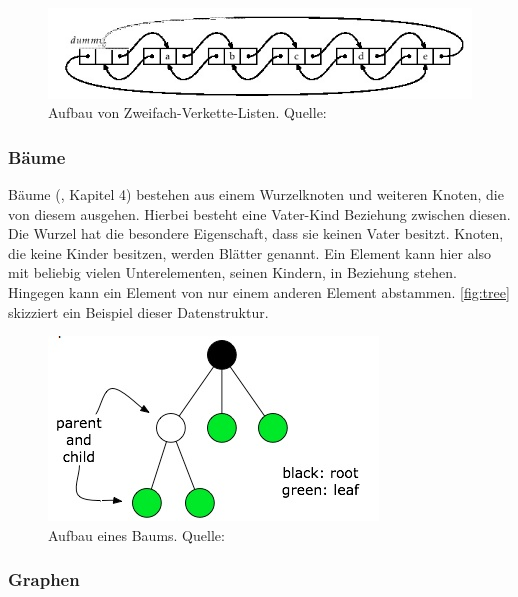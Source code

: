 \documentclass[a4paper]{article}
\begin{document}
	\begin{figure}[H] 
		\includegraphics[width=\linewidth]{../Bilder/double_linked_list.jpg}
		\caption
		{
			Aufbau von Zweifach-Verkette-Listen.
			Quelle: \cite{DLList}
		}
		\label{fig:double_linked_list}
	\end{figure}	
	
	\subsubsection{Bäume}
		
	Bäume (\cite{FundData}, Kapitel 4) bestehen aus einem Wurzelknoten
	und weiteren Knoten, die von diesem ausgehen. Hierbei besteht eine Vater-Kind
	Beziehung zwischen diesen. Die Wurzel hat die besondere Eigenschaft, dass
	sie keinen Vater besitzt. Knoten, die keine Kinder besitzen, werden Blätter
	genannt. Ein Element kann hier also mit beliebig vielen Unterelementen, seinen
	Kindern, in Beziehung stehen. Hingegen kann ein Element von nur einem anderen
	Element abstammen. \autoref{fig:tree} skizziert ein Beispiel
	dieser Datenstruktur.
	
	\begin{figure}[H] 
		\centerline{
			\includegraphics{../Bilder/tree.jpg}
		}
		\caption
		{
			Aufbau eines Baums.
			Quelle: \cite{Trees}
		}
		\label{fig:tree}
	\end{figure}
	
	\subsubsection{Graphen}
	
\end{document}
